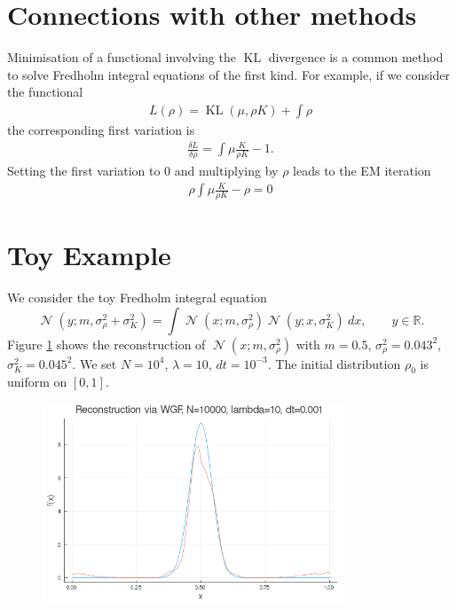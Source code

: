 \documentclass[a4paper]{article}
\DeclareMathOperator{\N}{\mathcal{N}}
\DeclareMathOperator{\KL}{KL}
\begin{document}
\section{Connections with other methods}
Minimisation of a functional involving the $\KL$ divergence is a common method to solve Fredholm integral equations of the first kind.
For example, if we consider the functional
\begin{align*}
L(\rho) = \KL(\mu, \rho K) + \int \rho
\end{align*}
the corresponding first variation is
\begin{align*}
\frac{\delta L}{\delta \rho}= \int \mu\frac{K}{\rho K} - 1.
\end{align*}
Setting the first variation to 0 and multiplying by $\rho$ leads to the EM iteration
\begin{align*}
\rho\int \mu\frac{K}{\rho K} - \rho = 0
\end{align*}
\section{Toy Example}

We consider the toy Fredholm integral equation
\begin{equation*}
\N(y; m, \sigma_{\rho}^2 + \sigma_K^2) = \int \N(x; m, \sigma_{\rho}^2)\N(y; x, \sigma_K^2)\ dx,\qquad y\in\mathbb{R}.
\end{equation*}
Figure \ref{fig:at} shows the reconstruction of $\N(x; m, \sigma_{\rho}^2)$ with $m=0.5$, $\sigma_{\rho}^2 = 0.043^2$, $\sigma_K^2 = 0.045^2$.
We set $N=10^{4}$, $\lambda = 10$, $dt = 10^{-3}$. The initial distribution $\rho_0$ is uniform on $[0, 1]$.

\begin{figure}
\centering
\includegraphics[width = 0.8\textwidth]{analitically_tractable}
\caption{ }
\label{fig:at}
\end{figure}



\end{document}
